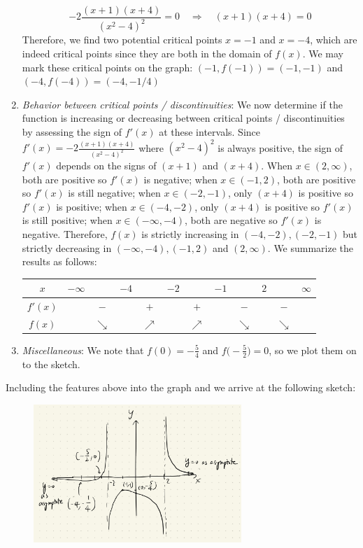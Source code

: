 \documentclass[11pt,letterpaper]{article}
\begin{document}
\begin{enumerate}
    \[-2\frac{(x+1)(x+4)}{(x^2-4)^2} = 0 \quad \Rightarrow \quad  (x+1)(x+4) = 0\]
    Therefore, we find two potential critical points $x=-1$ and $x=-4$, which are indeed critical points since they are both in the domain of $f(x)$.  We may mark these critical points on the graph: $(-1, f(-1)) = (-1, -1)$ and $(-4, f(-4)) = (-4, -1/4)$
    \item \textit{Behavior between critical points / discontinuities}: We now determine if the function is increasing or decreasing between critical points / discontinuities by assessing the sign of $f'(x)$ at these intervals.  Since $f'(x) = -2\frac{(x+1)(x+4)}{(x^2-4)^2}$ where $(x^2-4)^2$ is always positive, the sign of $f'(x)$ depends on the signs of $(x+1)$ and $(x+4)$.  When $x \in (2, \infty)$, both are positive so $f'(x)$ is negative; when $x \in (-1, 2)$, both are positive so $f'(x)$ is still negative; when $x \in (-2, -1)$, only $(x+4)$ is positive so $f'(x)$ is positive; when $x \in (-4, -2)$, only $(x+4)$ is positive so $f'(x)$ is still positive; when $x \in (-\infty, -4)$, both are negative so $f'(x)$ is negative.  Therefore, $f(x)$ is strictly increasing in $(-4,-2), (-2,-1)$ but strictly decreasing in $(-\infty, -4),(-1, 2)$ and $(2, \infty)$. We summarize the results as follows:
    \begin{table}[h]
        \centering
        \begin{tabular}{c|ccccccccccc}
            $x$ &$-\infty$& &$-4$& &$-2$& &$-1$& &$2$& &$\infty$ \\
            \hline
            $f'(x)$ & & $-$ & & $+$ & & $+$ & &  $-$ & & $-$ & \\
            $f(x)$  & & $\searrow$ & & $\nearrow$ & & $\nearrow$ & & $\searrow$ & & $\searrow$ &
        \end{tabular}
    \end{table}
    \item \textit{Miscellaneous}: We note that $f(0) = -\frac{5}{4}$ and $f\big(-\frac{5}{2}\big) = 0$, so we plot them on to the sketch.
\end{enumerate}
Including the features above into the graph and we arrive at the following sketch:
\begin{figure}[h]
    \centering
    \includegraphics[width = 0.7\textwidth]{../graph/A12_Sol_4.png}
\end{figure}
\vspace{6mm}
\end{document}
